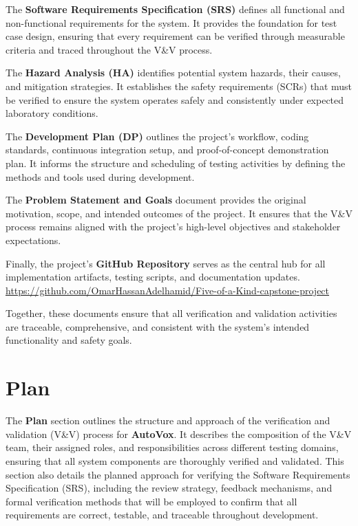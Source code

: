 \documentclass[12pt, titlepage]{article}
\begin{document}
The \textbf{Software Requirements Specification (SRS)} defines all functional and non-functional requirements for the system. It provides the foundation for test case design, ensuring that every requirement can be verified through measurable criteria and traced throughout the V\&V process.

The \textbf{Hazard Analysis (HA)} identifies potential system hazards, their causes, and mitigation strategies. It establishes the safety requirements (SCRs) that must be verified to ensure the system operates safely and consistently under expected laboratory conditions.

The \textbf{Development Plan (DP)} outlines the project’s workflow, coding standards, continuous integration setup, and proof-of-concept demonstration plan. It informs the structure and scheduling of testing activities by defining the methods and tools used during development.

The \textbf{Problem Statement and Goals} document provides the original motivation, scope, and intended outcomes of the project. It ensures that the V\&V process remains aligned with the project’s high-level objectives and stakeholder expectations.

Finally, the project’s \textbf{GitHub Repository} serves as the central hub for all implementation artifacts, testing scripts, and documentation updates.\\
\url{https://github.com/OmarHassanAdelhamid/Five-of-a-Kind-capstone-project}

Together, these documents ensure that all verification and validation activities are traceable, comprehensive, and consistent with the system’s intended functionality and safety goals.
\section{Plan}

The \textbf{Plan} section outlines the structure and approach of the verification and validation (V\&V) process for \textbf{AutoVox}. It describes the composition of the V\&V team, their assigned roles, and responsibilities across different testing domains, ensuring that all system components are thoroughly verified and validated. This section also details the planned approach for verifying the Software Requirements Specification (SRS), including the review strategy, feedback mechanisms, and formal verification methods that will be employed to confirm that all requirements are correct, testable, and traceable throughout development.
\end{document}
